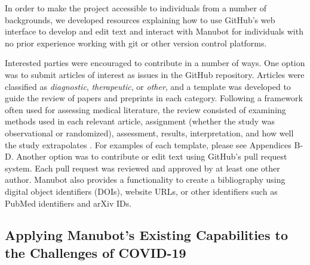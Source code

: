 \documentclass[sigconf]{acmart}
\begin{document}
In order to make the project accessible to individuals from a number of backgrounds, we developed resources explaining how to use GitHub's web interface to develop and edit text and interact with Manubot for individuals with no prior experience working with git or other version control platforms.

Interested parties were encouraged to contribute in a number of ways.
One option was to submit articles of interest as issues in the GitHub repository.
Articles were classified as \emph{diagnostic}, \emph{therapeutic}, or \emph{other}, and a template was developed to guide the review of papers and preprints in each category.
Following a framework often used for assessing medical literature, the review consisted of examining methods used in each relevant article, assignment (whether the study was observational or randomized), assessment, results, interpretation, and how well the study extrapolates \citep{17OQtAY4l}.
For examples of each template, please see Appendices B-D.
Another option was to contribute or edit text using GitHub's pull request system.
Each pull request was reviewed and approved by at least one other author.
Manubot also provides a functionality to create a bibliography using digital object identifiers (DOIs), website URLs, or other identifiers such as PubMed identifiers and arXiv IDs.

\hypertarget{applying-manubots-existing-capabilities-to-the-challenges-of-covid-19}{%
\subsection{Applying Manubot's Existing Capabilities to the Challenges of COVID-19}\label{applying-manubots-existing-capabilities-to-the-challenges-of-covid-19}}
\end{document}
